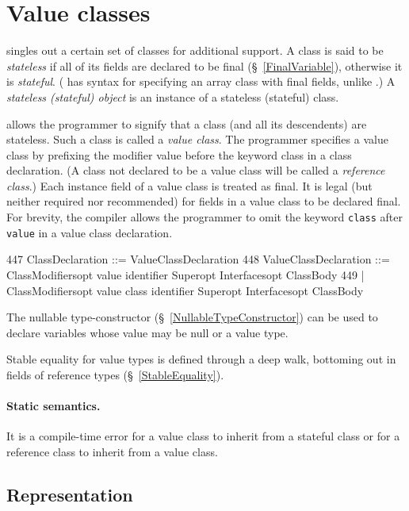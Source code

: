 \section{Value classes}\label{ValueClasses}

{}\Xten{} singles out a certain set of classes for additional
support. A class is said to be {\em stateless} if all of its fields
are declared to be {\cf final} (\S~\ref{FinalVariable}), otherwise it
is {\em stateful}. (\Xten{} has syntax for specifying an array class
with final fields, unlike \java{}.) A {\em stateless (stateful)
object} is an instance of a stateless (stateful) class.

{}\Xten{} allows the programmer to signify that a class (and all its
descendents) are stateless. Such a class is called a {\em value
class}.  The programmer specifies a value class by prefixing the
modifier {\cf value} before the keyword {\cf class} in a class
declaration.  (A class not declared to be a value class will be called
a {\em reference class}.)  Each instance field of a value class is
treated as {\cf final}. It is legal (but neither required nor recommended)
for fields in a value class to be declared final. For brevity, the \Xten{}
compiler allows the programmer to omit the keyword {\tt class} after
{\tt  value} in a value class declaration.

\begin{x10}
447  ClassDeclaration ::= ValueClassDeclaration
448  ValueClassDeclaration ::= 
       ClassModifiersopt value identifier Superopt 
          Interfacesopt ClassBody
449  | ClassModifiersopt value class identifier 
          Superopt Interfacesopt ClassBody
\end{x10}

The {\cf nullable} type-constructor (\S~\ref{NullableTypeConstructor}) can
be used to declare variables whose value may be {\cf null} or a value
type.

\cbstart
Stable equality for value types is defined through a deep walk,
bottoming out in fields of reference types (\S~\ref{StableEquality}).
\cbend

\paragraph{Static semantics.}
It is a compile-time error for a value class to inherit from a
stateful class or for a reference class to inherit from a value class.

\subsection{Representation}

